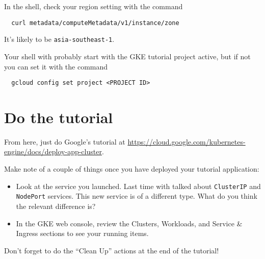 \documentclass{article}
\begin{document}
In the shell, check your region setting with the command

\begin{verbatim}
  curl metadata/computeMetadata/v1/instance/zone
\end{verbatim}

It's likely to be \texttt{asia-southeast-1}.

Your shell with probably start with the GKE tutorial project active, but if not you can set it with the command

\begin{verbatim}
  gcloud config set project <PROJECT ID>
\end{verbatim}

\section{Do the tutorial}
From here, just do Google's tutorial at \url{https://cloud.google.com/kubernetes-engine/docs/deploy-app-cluster}.

Make note of a couple of things once you have deployed your tutorial application:

\begin{itemize}
  \item Look at the service you launched. Last time with talked about \texttt{ClusterIP} and \texttt{NodePort} services. This new service is of a different type. What do you think the relevant difference is?
  \item In the GKE web console, review the Clusters, Workloads, and Service \& Ingress sections to see your running items.
\end{itemize}

Don't forget to do the ``Clean Up'' actions at the end of the tutorial!  
\end{document}
